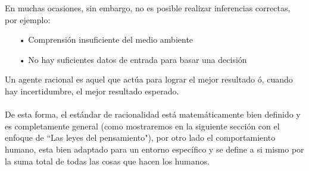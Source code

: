 \documentclass[12pt,a4paper]{book}
\begin{document}
En muchas ocasiones, sin embargo, no es posible realizar inferencias correctas, por ejemplo:
\begin{enumerate}
\item[•] Comprensión insuficiente del medio ambiente
\item[•] No hay suficientes datos de entrada para basar una decisión
\end{enumerate}
Un agente racional es aquel que actúa para lograr el mejor resultado ó, cuando hay incertidumbre, el mejor resultado esperado.\\
\\
De esta forma, el estándar de racionalidad está matemáticamente bien definido y es completamente general (como mostraremos en la siguiente sección con el enfoque de ``Las leyes del pensamiento"), por otro lado el comportamiento humano, esta bien adaptado para un entorno específico y se define a si mismo por la suma total de todas las cosas que hacen los humanos.
\end{document}
